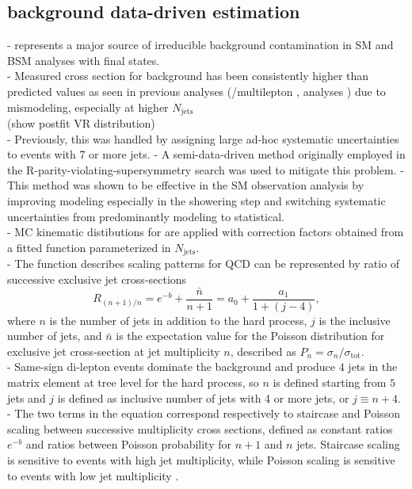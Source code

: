\documentclass[../thesis.tex]{subfiles}
\begin{document}
\subsection{\ttW background data-driven estimation}
- \ttW represents a major source of irreducible background contamination in SM and BSM analyses with \tttt final states.\\
- Measured cross section for \ttW background has been consistently higher than predicted values as seen in previous analyses (\ttH/\ttW multilepton \citep{bg:ttH_ttW_ML}\cite{ana:ttW_meas}, \tttt analyses \citep{ana:tttt_ev}\citep{ana:tttt_obs}) due to mismodeling, especially at higher $N_\mathrm{jets}$ \\
(show postfit \ttW VR distribution)\\
- Previously, this was handled by assigning large ad-hoc systematic uncertainties to \ttW events with 7 or more jets. 
- A semi-data-driven method originally employed in the R-parity-violating-supersymmetry search \citep{ana:r_par_susy_2021} was used to mitigate this problem. 
- This method was shown to be effective in the SM \tttt observation analysis \citep{ana:tttt_obs} by improving \ttW modeling especially in the showering step and switching \ttW systematic uncertainties from predominantly modeling to statistical.\\
- MC kinematic distibutions for \ttW are applied with correction factors obtained from a fitted function parameterized in $N_\mathrm{jets}$.\\
- The function describes scaling patterns for QCD \citep{bg:qcd_scaling} can be represented by ratio of successive exclusive jet cross-sections
\begin{equation}
R_{(n+1)/n} = e^{-b} + \frac{\bar{n}}{n+1} = a_0 + \frac{a_1}{1+(j-4)},
\end{equation}
where $n$ is the number of jets in addition to the hard process, $j$ is the inclusive number of jets, and $\bar{n}$ is the expectation value for the Poisson distribution for exclusive jet cross-section at jet multiplicity $n$, described as $P_n=\sigma_n/\sigma_\mathrm{tot}$.\\
- Same-sign di-lepton \ttW events dominate the \ttW background and produce $4$ jets in the matrix element at tree level for the hard process, so $n$ is defined starting from $5$ jets and $j$ is defined as inclusive number of jets with 4 or more jets, or $j\equiv n+4$.\\
- The two terms in the equation correspond respectively to staircase and Poisson scaling between successive multiplicity cross sections, defined as constant ratios $e^{-b}$ and ratios between Poisson probability for $n+1$ and $n$ jets. Staircase scaling is sensitive to events with high jet multiplicity, while Poisson scaling is sensitive to events with low jet multiplicity \citep{bg:qcd_scaling}.\\
\end{document}
